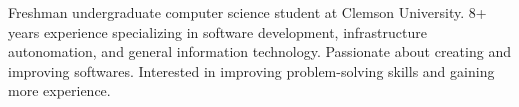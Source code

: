 

\begin{cvparagraph}

Freshman undergraduate computer science student at Clemson University. 8+ years experience specializing in software development, infrastructure autonomation, and general information technology. Passionate about creating and improving softwares. Interested in improving problem-solving skills and gaining more experience.

\end{cvparagraph}
